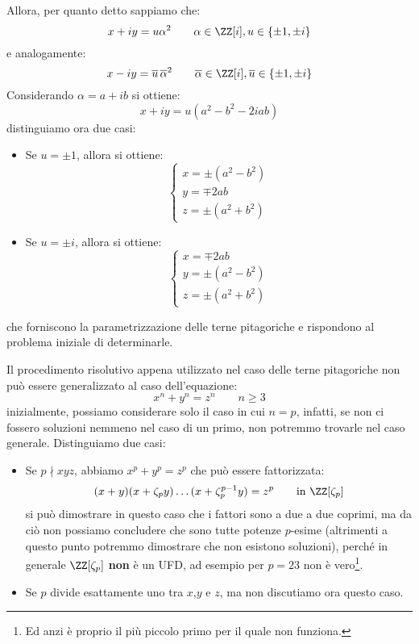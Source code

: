 \documentclass[11pt]{scrartcl}
\begin{document}
Allora, per quanto detto sappiamo che:
\[ x + iy = u\alpha^2 \qquad \alpha \in \ZZ[i], u \in \{\pm 1, \pm i\}
\]
e analogamente:
\[ x - iy = \overline u \,\overline\alpha^2 \qquad \overline\alpha \in \ZZ[i], \overline u \in \{\pm 1, \pm i\}
    \]
Considerando $\alpha = a+ib$ si ottiene:
\[ x + iy = u(a^2-b^2-2iab)
    \]
distinguiamo ora due casi:
\begin{itemize}
    \item Se $u = \pm 1$, allora si ottiene:
    \[ \begin{cases}
        x = \pm(a^2-b^2) \\
        y = \mp 2ab \\
        z = \pm (a^2+b^2)
    \end{cases}
        \]
    \item Se $u = \pm i$, allora si ottiene:
    \[ \begin{cases}
        x = \mp 2ab \\
        y = \pm(a^2-b^2) \\
        z = \pm (a^2+b^2)
    \end{cases}
    \]
\end{itemize}
che forniscono la parametrizzazione delle terne pitagoriche e rispondono al problema iniziale di determinarle.

\newpage
\begin{remark}
    Il procedimento risolutivo appena utilizzato nel caso delle terne pitagoriche non può essere generalizzato al caso dell'equazione:
    \[ x^n + y^n = z^n \qquad n\geq 3
        \]
    inizialmente, possiamo considerare solo il caso in cui $n = p$, infatti, se non ci fossero soluzioni nemmeno nel caso di un primo, non potremmo
    trovarle nel caso generale. Distinguiamo due casi:
    \begin{itemize}
        \item Se $p \nmid xyz$, abbiamo $x^p+y^p = z^p$ che può essere fattorizzata:
            \[ (x+y)(x+\zeta_py) \ldots (x + \zeta_p^{p-1}y) = z^p \qquad \text{in $\ZZ[\zeta_p]$}
                \]
            si può dimostrare in questo caso che i fattori sono a due a due coprimi,
            ma da ciò non possiamo concludere che sono tutte potenze $p$-esime (altrimenti a questo punto potremmo dimostrare che non esistono soluzioni),
            perché in generale $\ZZ[\zeta_p]$ \textbf{non} è un UFD, ad esempio per $p = 23$ non è vero\footnote{Ed anzi è proprio il più piccolo primo per il quale non funziona.}.
        \item Se $p$ divide esattamente uno tra $x$,$y$ e $z$, ma non discutiamo ora questo caso.
    \end{itemize}
\end{remark}
\end{document}
